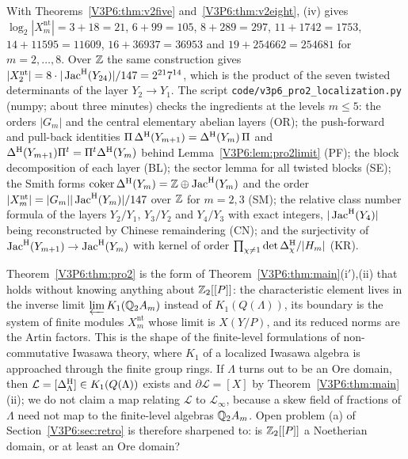 \begin{remark}\label{V3P6:rem:pro2check}
With Theorems~\ref{V3P6:thm:v2five} and~\ref{V3P6:thm:v2eight}, (iv) gives
$\log_2|X_m^{\mathrm{nt}}|=3+18=21$, $6+99=105$, $8+289=297$, $11+1742=1753$, $14+11595=11609$,
$16+36937=36953$ and $19+254662=254681$ for $m=2,\dots,8$. Over $\mathbb{Z}$ the same construction gives
$|X_2^{\mathrm{nt}}|=8\cdot|\operatorname{Jac}^{\mathrm{H}}(Y_{24})|/147=2^{21}7^{14}$, which is the product of the seven
twisted determinants of the layer $Y_2\to Y_1$. The script \texttt{code/v3p6\_pro2\_localization.py}
(numpy; about three minutes) checks the ingredients at the levels $m\le5$: the orders $|G_m|$ and
the central elementary abelian layers (OR); the push-forward and pull-back identities
$\Pi\,\Delta^{\mathrm{H}}(Y_{m+1})=\Delta^{\mathrm{H}}(Y_m)\,\Pi$ and $\Delta^{\mathrm{H}}(Y_{m+1})\Pi^{t}=\Pi^{t}\Delta^{\mathrm{H}}(Y_m)$ behind
Lemma~\ref{V3P6:lem:pro2limit} (PF); the block decomposition of each layer (BL); the sector lemma
for all twisted blocks (SE); the Smith forms $\operatorname{coker}\Delta^{\mathrm{H}}(Y_m)=\mathbb{Z}\oplus\operatorname{Jac}^{\mathrm{H}}(Y_m)$ and the order
$|X_m^{\mathrm{nt}}|=|G_m||\operatorname{Jac}^{\mathrm{H}}(Y_m)|/147$ over $\mathbb{Z}$ for $m=2,3$ (SM); the relative class number
formula of the layers $Y_2/Y_1$, $Y_3/Y_2$ and $Y_4/Y_3$ with exact integers, $|\operatorname{Jac}^{\mathrm{H}}(Y_4)|$ being
reconstructed by Chinese remaindering (CN); and the surjectivity of
$\operatorname{Jac}^{\mathrm{H}}(Y_{m+1})\to\operatorname{Jac}^{\mathrm{H}}(Y_m)$ with kernel of order $\prod_{\chi\ne1}\det\Delta^{\mathrm{H}}_\chi/|H_m|$ (KR).
\end{remark}

\begin{remark}\label{V3P6:rem:pro2scope}
Theorem~\ref{V3P6:thm:pro2} is the form of Theorem~\ref{V3P6:thm:main}(i$'$),(ii) that holds without
knowing anything about $\mathbb{Z}_2[[P]]$: the characteristic element lives in the inverse limit
$\varprojlim K_1(\mathbb{Q}_2A_m)$ instead of $K_1(Q(\Lambda))$, its boundary is the system of finite
modules $X_m^{\mathrm{nt}}$ whose limit is $X(Y/P)$, and its reduced norms are the Artin factors. This
is the shape of the finite-level formulations of non-commutative Iwasawa theory, where $K_1$ of a
localized Iwasawa algebra is approached through the finite group rings. If $\Lambda$ turns out to be
an Ore domain, then $\mathcal L=[\Delta^{\mathrm{H}}_\Lambda]\in K_1(Q(\Lambda))$ exists and
$\partial\mathcal L=[X]$ by Theorem~\ref{V3P6:thm:main}(ii); we do not claim a map relating
$\mathcal L$ to $\mathcal L_\infty$, because a skew field of fractions of $\Lambda$ need not map to
the finite-level algebras $\mathbb{Q}_2A_m$. Open
problem (a) of Section~\ref{V3P6:sec:retro} is therefore sharpened to: is $\mathbb{Z}_2[[P]]$ a Noetherian
domain, or at least an Ore domain?
\end{remark}

